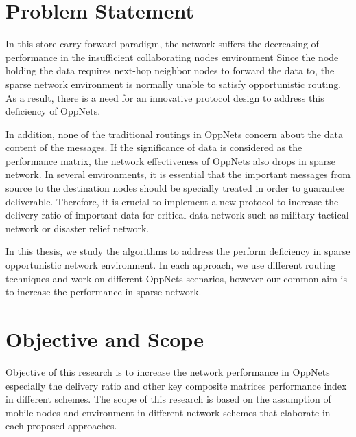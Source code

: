 \section{Problem Statement}
\label{intro:Problem Statement}
In this store-carry-forward paradigm, the network suffers the decreasing of performance in the insufficient collaborating nodes environment \cite{Nousiainen2013,Spyropoulos2010}
Since the node holding the data requires next-hop neighbor nodes to forward the data to, the sparse network environment is normally unable to satisfy opportunistic routing.
As a result, there is a need for an innovative protocol design to address this deficiency of OppNets.

In addition, none of the traditional routings in OppNets concern about the data content of the messages. 
If the significance of data is considered as the performance matrix, the network effectiveness of OppNets also drops in sparse network. 
In several environments, it is essential that the important messages from source to the destination nodes should be specially treated in order to guarantee deliverable.
Therefore, it is crucial to implement a new protocol to increase the delivery ratio of important data for critical data network such as military tactical network or disaster relief network.

In this thesis, we study the algorithms to address the perform deficiency in sparse opportunistic network environment.
In each approach, we use different routing techniques and work on different OppNets scenarios, however our common aim is to increase the performance in sparse network.
\section{Objective and Scope}
\label{intro:Objective and Scope}
Objective of this research is to increase the network performance in OppNets especially the delivery ratio and other key composite matrices performance index in different schemes.
The scope of this research is based on the assumption of mobile nodes and environment in different network schemes that elaborate in each proposed approaches.

